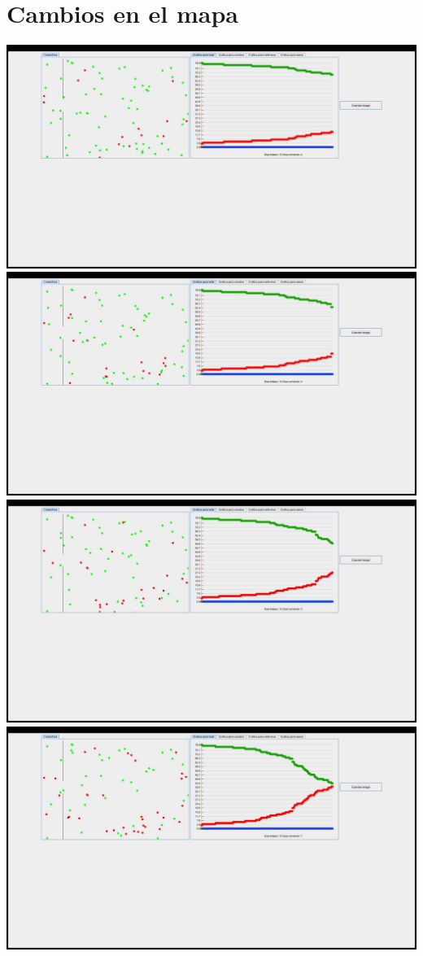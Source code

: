 \documentclass{report}
\begin{document}
\section{Cambios en el mapa}
\includegraphics[scale=0.20]{grafica1.jpeg}
\includegraphics[scale=0.20]{grafica2.jpeg}
\includegraphics[scale=0.20]{grafica3.jpeg}
\includegraphics[scale=0.20]{grafica4.jpeg}
\end{document}
